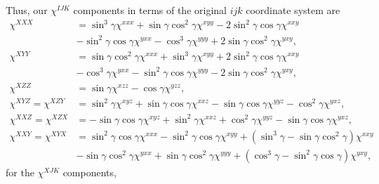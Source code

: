 \documentclass[aps,prb,10pt,letterpaper,notitlepage]{revtex4-1}
\begin{document}
Thus, our $\chi^{IJK}$ components in terms of the original $ijk$ coordinate
system are
\begin{equation}\label{eq:xcomps}
\begin{split}
\chi^{XXX} 
&=  \sin^{3}\gamma          \chi^{xxx}
 +  \sin\gamma \cos^{2}\gamma \chi^{xyy}
 - 2\sin^{2}\gamma \cos\gamma \chi^{xxy}\\
&-  \sin^{2}\gamma \cos\gamma \chi^{yxx}
 -  \cos^{3}\gamma          \chi^{yyy}
 + 2\sin\gamma \cos^{2}\gamma \chi^{yxy},\\[10pt]
\chi^{XYY} 
&=  \sin\gamma \cos^{2}\gamma \chi^{xxx}
 +  \sin^{3}\gamma          \chi^{xyy}
 + 2\sin^{2}\gamma \cos\gamma \chi^{xxy}\\
&-  \cos^{3}\gamma          \chi^{yxx}
 -  \sin^{2}\gamma \cos\gamma \chi^{yyy}
 - 2\sin\gamma \cos^{2}\gamma \chi^{yxy},\\[10pt]
\chi^{XZZ} 
&= \sin\gamma \chi^{xzz}
 - \cos\gamma \chi^{yzz},\\[10pt]
\chi^{XYZ} = \chi^{XZY}
&=
   \sin^{2}\gamma      \chi^{xyz}
 + \sin\gamma \cos\gamma \chi^{xxz}
 - \sin\gamma \cos\gamma \chi^{yyz}
 - \cos^{2}\gamma      \chi^{yxz},\\[10pt]
\chi^{XXZ} = \chi^{XZX}
&=
 - \sin\gamma \cos\gamma \chi^{xyz}
 + \sin^{2}\gamma      \chi^{xxz}
 + \cos^{2}\gamma      \chi^{yyz}
 - \sin\gamma \cos\gamma \chi^{yxz},\\[10pt]
\chi^{XXY} = \chi^{XYX} 
&= 
   \sin^{2}\gamma \cos\gamma \chi^{xxx}
 - \sin^{2}\gamma \cos\gamma \chi^{xyy}
 + (\sin^{3}\gamma - \sin\gamma \cos^{2}\gamma) \chi^{xxy}\\
&- \sin\gamma \cos^{2}\gamma \chi^{yxx}
 + \sin\gamma \cos^{2}\gamma \chi^{yyy}
 + (\cos^{3}\gamma - \sin^{2}\gamma \cos\gamma) \chi^{yxy},
\end{split}
\end{equation}
for the $\chi^{XJK}$ components,
\end{document}
